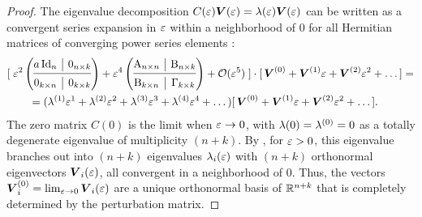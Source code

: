 \documentclass[letterpaper, reqno, 11pt]{amsart}
\theoremstyle{definition}
\theoremstyle{remark}
\numberwithin{equation}{section}
\begin{document}
\begin{proof}
The eigenvalue decomposition $C(\varepsilon)\boldsymbol{V}(\varepsilon)=\lambda(\varepsilon)\boldsymbol{V}(\varepsilon)$ can be written as a convergent series expansion in $\varepsilon$ within a neighborhood of $0$ for all Hermitian matrices of converging power series elements \cite{rellich1969}:
\begin{align*}
& [\; \vep^2
\left( \begin{array}{@{}c|c@{}}
   \begin{matrix}
		a\,\Id_{n}
   \end{matrix} 
      & 0_{n\times k} \\
   \cmidrule[0.4pt]{1-2}
   0_{k\times n} & 0_{k\times k}  \\
\end{array}  \right)
	+\vep^4
\left( \begin{array}{@{}c|c@{}}
   \begin{matrix}
       \mr{A}_{n\times n}
   \end{matrix} 
      & \mr{B}_{n\times k} \\
   \cmidrule[0.4pt]{1-2}
   \mr{B}_{k\times n} & \Gamma_{k\times k}  \\
\end{array} \right) + \cO(\vep^{5})\; ]\cdot [\, \bs{V}^{(0)} + \bs{V}^{(1)}\vep+\bs{V}^{(2)}\vep^2+\dots \,] = \\
&\qquad = (\lbd^{(1)}\vep^1+\lbd^{(2)}\vep^2+\lbd^{(3)}\vep^3+\lbd^{(4)}\vep^4+\dots)[\, \bs{V}^{(0)} + \bs{V}^{(1)}\vep+\bs{V}^{(2)}\vep^2+\dots \,].
\end{align*}
The zero matrix $C(0)$ is the limit when $\varepsilon\rightarrow 0$, with $\lambda(0)=\lambda^{(0)}=0$ as a totally degenerate eigenvalue of multiplicity $(n+k)$. By \cite[ch. I, Th. 1]{rellich1969}, for $\varepsilon >0$, this eigenvalue branches out  into $(n+k)$ eigenvalues $\lambda_i(\varepsilon)$ with $(n+k)$ orthonormal eigenvectors $\boldsymbol{V}_i(\varepsilon)$, all convergent in a neighborhood of $0$. Thus, the vectors $\boldsymbol{V}^{(0)}_i=\lim_{\varepsilon\rightarrow 0}\boldsymbol{V}_i(\varepsilon)$ are a unique orthonormal basis of ${\mathbb R}^{n+k}$ that is completely determined by the perturbation matrix.


\end{proof}
\end{document}
